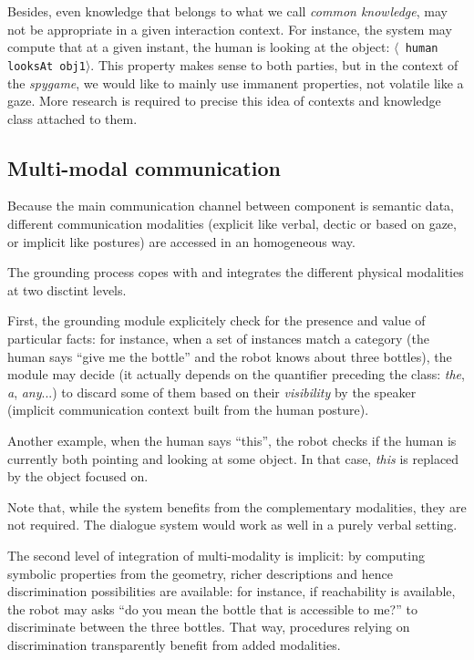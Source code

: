 \documentclass[letterpaper, 10 pt, conference]{ieeeconf}  %
\newcommand{\stmt}[1]{{\footnotesize \tt $\langle$ #1\relax$\rangle$}}
\begin{document}
Besides, even knowledge that belongs to what we call \emph{common knowledge},
may not be appropriate in a given interaction context. For instance, the system
may compute that at a given instant, the human is looking at the object:
\stmt{human looksAt obj1}. This property makes sense to both parties, but in
the context of the \emph{spygame}, we would like to mainly use immanent
properties, not volatile like a gaze. More research is required to precise this
idea of contexts and knowledge class attached to them.



\subsection{Multi-modal communication}

Because the main communication channel between component is semantic data,
different communication modalities (explicit like verbal, dectic or based on
gaze, or implicit like postures) are accessed in an homogeneous way.

The grounding process copes with and integrates the different physical
modalities at two disctint levels.

First, the grounding module explicitely check for the presence and value of
particular facts: for instance, when a set of instances match a category (the
human says ``give me the bottle'' and the robot knows about three bottles), the
module may decide (it actually depends on the quantifier preceding the class:
\emph{the}, \emph{a}, \emph{any}...) to discard some of them based on their
\emph{visibility} by the speaker (implicit communication context built from the
human posture).

Another example, when the human says ``this'', the robot checks if the human is
currently both pointing and looking at some object. In that case, \emph{this}
is replaced by the object focused on.

Note that, while the system benefits from the complementary modalities, they
are not required. The dialogue system would work as well in a purely verbal
setting.

The second level of integration of multi-modality is implicit: by computing
symbolic properties from the geometry, richer descriptions and hence
discrimination possibilities are available: for instance, if reachability is
available, the robot may asks ``do you mean the bottle that is accessible to
me?'' to discriminate between the three bottles. That way, procedures relying
on discrimination transparently benefit from added modalities.
\end{document}
